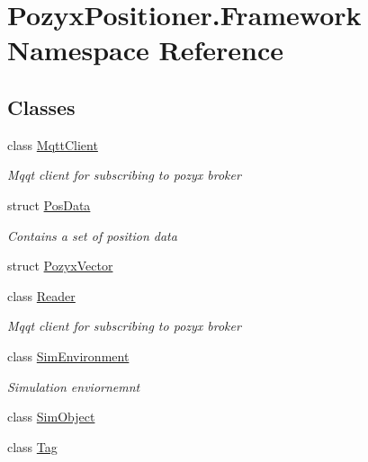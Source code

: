 \hypertarget{namespace_pozyx_positioner_1_1_framework}{}\section{Pozyx\+Positioner.\+Framework Namespace Reference}
\label{namespace_pozyx_positioner_1_1_framework}
\subsection*{Classes}
\begin{DoxyCompactItemize}
\item 
class \hyperlink{class_pozyx_positioner_1_1_framework_1_1_mqtt_client}{Mqtt\+Client}
\begin{DoxyCompactList}\small\item\em Mqqt client for subscribing to pozyx broker \end{DoxyCompactList}\item 
struct \hyperlink{struct_pozyx_positioner_1_1_framework_1_1_pos_data}{Pos\+Data}
\begin{DoxyCompactList}\small\item\em Contains a set of position data \end{DoxyCompactList}\item 
struct \hyperlink{struct_pozyx_positioner_1_1_framework_1_1_pozyx_vector}{Pozyx\+Vector}
\item 
class \hyperlink{class_pozyx_positioner_1_1_framework_1_1_reader}{Reader}
\begin{DoxyCompactList}\small\item\em Mqqt client for subscribing to pozyx broker \end{DoxyCompactList}\item 
class \hyperlink{class_pozyx_positioner_1_1_framework_1_1_sim_environment}{Sim\+Environment}
\begin{DoxyCompactList}\small\item\em Simulation enviornemnt \end{DoxyCompactList}\item 
class \hyperlink{class_pozyx_positioner_1_1_framework_1_1_sim_object}{Sim\+Object}
\item 
class \hyperlink{class_pozyx_positioner_1_1_framework_1_1_tag}{Tag}
\end{DoxyCompactItemize}
